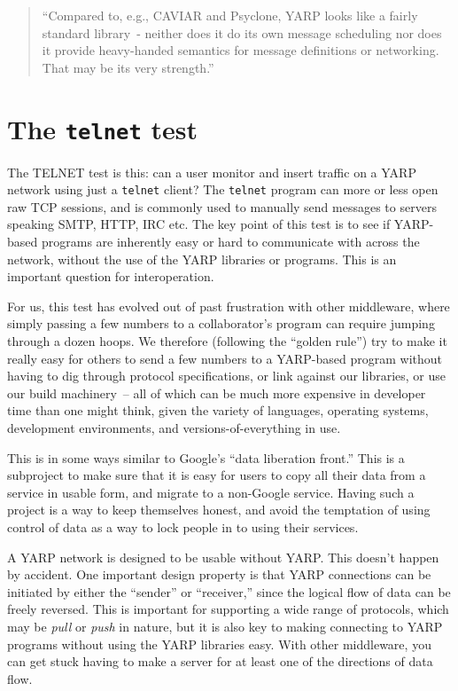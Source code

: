 \documentclass[letterpaper]{article}
\begin{document}
\begin{quote}
``Compared to, e.g., CAVIAR and Psyclone, YARP
looks like a fairly standard library~- neither does it
do its own message scheduling nor does it provide
heavy-handed semantics for message definitions or
networking. That may be its very strength.'' \cite{stefansson09yarp}
\end{quote}


\section{The {\tt telnet} test}

The TELNET test is this: can a user monitor and insert traffic on a
YARP network using just a {\tt telnet} client?  The {\tt telnet}
program can more or less open raw TCP sessions, and is commonly used
to manually send messages to servers speaking SMTP, HTTP, IRC etc.
The key point of this test is to see if YARP-based programs are
inherently easy or hard to communicate with across the network,
without the use of the YARP libraries or programs.  This is an
important question for interoperation.

For us, this test has evolved out of past frustration with other
middleware, where simply passing a few numbers to a collaborator's
program can require jumping through a dozen hoops.  We therefore
(following the ``golden rule'') try to make it really easy for others
to send a few numbers to a YARP-based program without having to dig
through protocol specifications, or link against our libraries, or use
our build machinery~-- all of which can be much more expensive in
developer time than one might think, given the variety of languages,
operating systems, development environments, and
versions-of-everything in use.

This is in some ways similar to Google's ``data liberation front.''
This is a subproject to make sure that it is easy for users to copy
all their data from a service in usable form, and migrate to a
non-Google service.  Having such 
a project is a way to keep themselves honest, and avoid the 
temptation of using control of data as a way to lock people in to
using their services.

A YARP network is designed to be usable without YARP.  This doesn't
happen by accident.  
One important design property is that YARP
connections can be initiated by either the ``sender'' or ``receiver,''
since the logical flow of data can be freely reversed.  This is
important for supporting a wide range of protocols, which may be {\it
  pull} or {\it push} in nature, but it is also key to making
connecting to YARP programs without using the YARP libraries easy.
With other middleware, you can get stuck having to make a server for
at least one of the directions of data flow.
\end{document}

